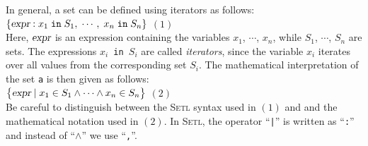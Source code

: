 In general, a set can be defined using iterators as follows: \\[0.2cm]
\hspace*{1.3cm} 
$\{ \textsl{expr} : x_1 \;\mathtt{in}\; S_1,\; \cdots,\; x_n \;\mathtt{in}\; S_n \}$
\hspace*{\fill} $(1)$ 
\\[0.2cm]
Here,  $\textsl{expr}$ is an expression containing the variables $x_1$, $\cdots$, $x_n$, while
$S_1$, $\cdots$, $S_n$ are sets.  The expressions 
\texttt{$x_i$ in $S_i$} are called \emph{iterators}, since the variable
 $x_i$ iterates over all values from the corresponding set  $S_i$.
The mathematical interpretation of the set \texttt{a} is then given as follows:
\\[0.2cm]
\hspace*{1.3cm} 
$\bigl\{ \textsl{expr} \mid x_1 \in S_1 \wedge \cdots \wedge x_n \in S_n \bigr\}$
\hspace*{\fill} $(2)$  
\\[0.2cm]
Be careful to distinguish between the \textsc{Setl} syntax used in $(1)$ and 
and the mathematical notation used in $(2)$.  In \textsc{Setl}, the operator
``\texttt{|}'' is written as ``\texttt{:}'' and instead of ``$\wedge$'' we use
``\texttt{,}''.


